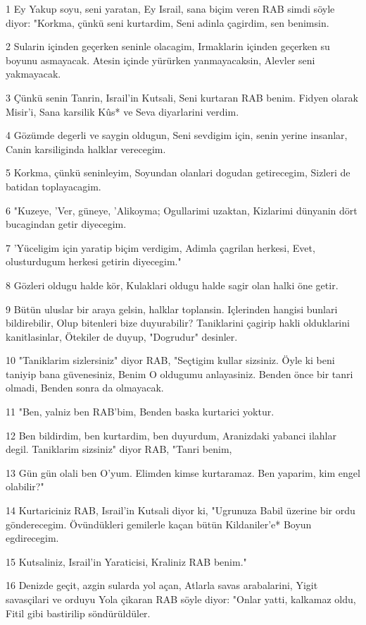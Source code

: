 \par 1 Ey Yakup soyu, seni yaratan, Ey Israil, sana biçim veren RAB simdi söyle diyor: "Korkma, çünkü seni kurtardim, Seni adinla çagirdim, sen benimsin.
\par 2 Sularin içinden geçerken seninle olacagim, Irmaklarin içinden geçerken su boyunu asmayacak. Atesin içinde yürürken yanmayacaksin, Alevler seni yakmayacak.
\par 3 Çünkü senin Tanrin, Israil'in Kutsali, Seni kurtaran RAB benim. Fidyen olarak Misir'i, Sana karsilik Kûs* ve Seva diyarlarini verdim.
\par 4 Gözümde degerli ve saygin oldugun, Seni sevdigim için, senin yerine insanlar, Canin karsiliginda halklar verecegim.
\par 5 Korkma, çünkü seninleyim, Soyundan olanlari dogudan getirecegim, Sizleri de batidan toplayacagim.
\par 6 "Kuzeye, 'Ver, güneye, 'Alikoyma; Ogullarimi uzaktan, Kizlarimi dünyanin dört bucagindan getir diyecegim.
\par 7 'Yüceligim için yaratip biçim verdigim, Adimla çagrilan herkesi, Evet, olusturdugum herkesi getirin diyecegim."
\par 8 Gözleri oldugu halde kör, Kulaklari oldugu halde sagir olan halki öne getir.
\par 9 Bütün uluslar bir araya gelsin, halklar toplansin. Içlerinden hangisi bunlari bildirebilir, Olup bitenleri bize duyurabilir? Taniklarini çagirip hakli olduklarini kanitlasinlar, Ötekiler de duyup, "Dogrudur" desinler.
\par 10 "Taniklarim sizlersiniz" diyor RAB, "Seçtigim kullar sizsiniz. Öyle ki beni taniyip bana güvenesiniz, Benim O oldugumu anlayasiniz. Benden önce bir tanri olmadi, Benden sonra da olmayacak.
\par 11 "Ben, yalniz ben RAB'bim, Benden baska kurtarici yoktur.
\par 12 Ben bildirdim, ben kurtardim, ben duyurdum, Aranizdaki yabanci ilahlar degil. Taniklarim sizsiniz" diyor RAB, "Tanri benim,
\par 13 Gün gün olali ben O'yum. Elimden kimse kurtaramaz. Ben yaparim, kim engel olabilir?"
\par 14 Kurtariciniz RAB, Israil'in Kutsali diyor ki, "Ugrunuza Babil üzerine bir ordu gönderecegim. Övündükleri gemilerle kaçan bütün Kildaniler'e* Boyun egdirecegim.
\par 15 Kutsaliniz, Israil'in Yaraticisi, Kraliniz RAB benim."
\par 16 Denizde geçit, azgin sularda yol açan, Atlarla savas arabalarini, Yigit savasçilari ve orduyu Yola çikaran RAB söyle diyor: "Onlar yatti, kalkamaz oldu, Fitil gibi bastirilip söndürüldüler.
